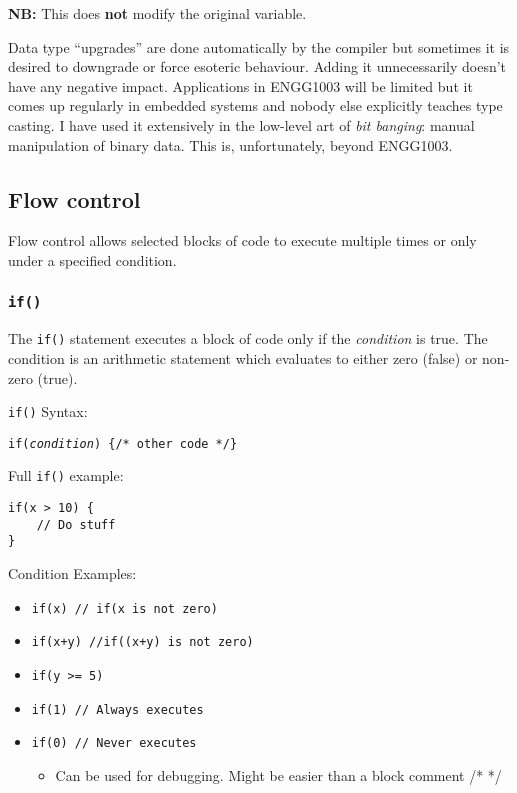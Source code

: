 \documentclass{lab}
\begin{document}
\begin{multicols}{2}
\textbf{NB:} This does \textbf{not} modify the original variable.

Data type ``upgrades'' are done automatically by the compiler but sometimes it is desired to downgrade or force esoteric behaviour. Adding it unnecessarily doesn't have any negative impact. Applications in ENGG1003 will be limited but it comes up regularly in embedded systems and nobody else explicitly teaches type casting. I have used it extensively in the low-level art of \textit{bit banging}: manual manipulation of binary data. This is, unfortunately, beyond ENGG1003.

\subsection{Flow control}

Flow control allows selected blocks of code to execute multiple times or only under a specified condition.

\subsubsection{\texttt{if()}}\label{sec:if}

The \texttt{if()} statement executes a block of code only if the \textit{condition} is true. The condition is an arithmetic statement which evaluates to either zero (false) or non-zero (true).

\texttt{if()} Syntax:

\texttt{if(\textit{condition}) \{/* other code */\}}

\columnbreak
Full \texttt{if()} example:

\begin{lstlisting}[style=CStyle]
if(x > 10) {
	// Do stuff
}
\end{lstlisting}

Condition Examples:
\begin{itemize}
\item \texttt{if(x) // if(x is not zero)}
\item \texttt{if(x+y) //if((x+y) is not zero)}
\item \texttt{if(y >= 5)}
\item \texttt{if(1) // Always executes}
\item \texttt{if(0) // Never executes}
	\begin{itemize}
		\item Can be used for debugging. Might be easier than a block comment /* */
	\end{itemize}
\end{itemize}


\end{multicols}
\end{document}
